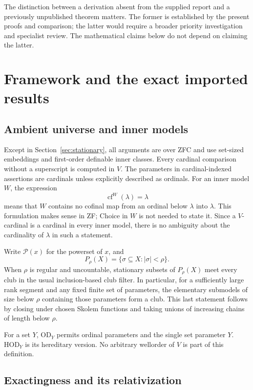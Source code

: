 \documentclass[11pt,letterpaper]{article}
\theoremstyle{definition}
\newcommand{\HOD}{\mathrm{HOD}}
\newcommand{\OD}{\mathrm{OD}}
\newcommand{\cf}{\operatorname{cf}}
\newcommand{\Pow}{\mathcal{P}}
\theoremstyle{remark}
\begin{document}
The distinction between a derivation absent from the supplied report and a previously unpublished theorem matters. The former is established by the present proofs and comparison; the latter would require a broader priority investigation and specialist review. The mathematical claims below do not depend on claiming the latter.

\section{Framework and the exact imported results}\label{sec:setup}

\subsection{Ambient universe and inner models}

Except in Section~\ref{sec:stationary}, all arguments are over ZFC and use set-sized embeddings and first-order definable inner classes. Every cardinal comparison without a superscript is computed in $V$. The parameters in cardinal-indexed assertions are cardinals unless explicitly described as ordinals. For an inner model $W$, the expression
\[
 \cf^W(\lambda)=\lambda
\]
means that $W$ contains no cofinal map from an ordinal below $\lambda$ into $\lambda$. This formulation makes sense in ZF; Choice in $W$ is not needed to state it. Since a $V$-cardinal is a cardinal in every inner model, there is no ambiguity about the cardinality of $\lambda$ in such a statement.

Write $\Pow(x)$ for the powerset of $x$, and
\[
 P_\rho(X)=\{\sigma\subseteq X:|\sigma|<\rho\}.
\]
When $\rho$ is regular and uncountable, stationary subsets of $P_\rho(X)$ meet every club in the usual inclusion-based club filter. In particular, for a sufficiently large rank segment and any fixed finite set of parameters, the elementary submodels of size below $\rho$ containing those parameters form a club. This last statement follows by closing under chosen Skolem functions and taking unions of increasing chains of length below $\rho$.

For a set $Y$, $\OD_Y$ permits ordinal parameters and the single set parameter $Y$. $\HOD_Y$ is its hereditary version. No arbitrary wellorder of $V$ is part of this definition.

\subsection{Exactingness and its relativization}
\end{document}
